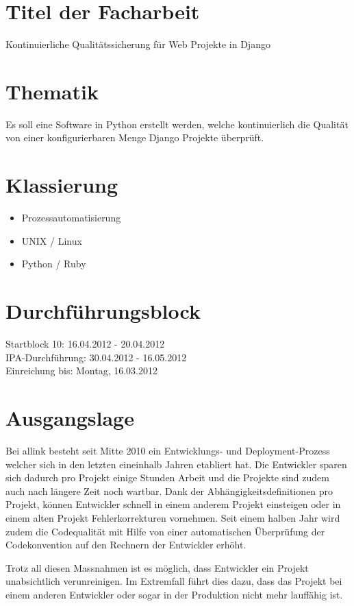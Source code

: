\section{Titel der Facharbeit} 
Kontinuierliche Qualitätssicherung für Web Projekte in Django
    
\section{Thematik}
Es soll eine Software in Python erstellt werden, welche kontinuierlich die Qualität von einer konfigurierbaren Menge Django Projekte überprüft.

\section{Klassierung}
    
\begin{itemize}
    \item Prozessautomatisierung 
    \item UNIX / Linux
    \item Python / Ruby
\end{itemize}
    
\section{Durchführungsblock}
Startblock 10: 16.04.2012 - 20.04.2012\\
IPA-Durchführung: 30.04.2012 - 16.05.2012\\
Einreichung bis: Montag, 16.03.2012\\
    
\section{Ausgangslage}
Bei allink besteht seit Mitte 2010 ein Entwicklungs- und Deployment-Prozess welcher sich in den letzten eineinhalb Jahren etabliert hat. Die Entwickler sparen sich dadurch pro Projekt einige Stunden Arbeit und die Projekte sind zudem auch nach längere Zeit noch wartbar. Dank der Abhängigkeitsdefinitionen pro Projekt, können Entwickler schnell in einem anderem Projekt einsteigen oder in einem alten Projekt Fehlerkorrekturen vornehmen. Seit einem halben Jahr wird zudem die Codequalität mit Hilfe von einer automatischen Überprüfung der Codekonvention auf den Rechnern der Entwickler erhöht.

Trotz all diesen Massnahmen ist es möglich, dass Entwickler ein Projekt unabsichtlich verunreinigen. Im Extremfall führt dies dazu, dass das Projekt bei einem anderen Entwickler oder sogar in der Produktion nicht mehr lauffähig ist.

